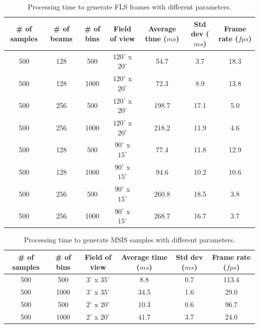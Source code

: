 \documentclass[final,5p,times]{elsarticle}
\begin{document}
\begin{table}[!h]
    \caption{Processing time to generate FLS frames with different parameters.}
    \label{table:fls}
    \begin{center}
        \begin{tabular}{| c | c | c | c | c | c | c |}
            \hline
            \# of samples & \# of beams & \# of bins & Field of view & Average time ($ms$) & Std dev ($ms$) & Frame rate ($fps$) \\
            \hline
            500     & 128     & 500       & $120^{\circ}$ x $20^{\circ}$        & 54.7    & 3.7   & 18.3 \\ \hline
            500     & 128     & 1000      & $120^{\circ}$ x $20^{\circ}$        & 72.3	& 8.9   & 13.8 \\ \hline
            500     & 256     & 500       & $120^{\circ}$ x $20^{\circ}$        & 198.7	& 17.1  & 5.0  \\ \hline
            500     & 256     & 1000      & $120^{\circ}$ x $20^{\circ}$        & 218.2	& 11.9  & 4.6  \\ \hline
            500     & 128     & 500       & $90^{\circ}$ x $15^{\circ}$         & 77.4	& 11.8  & 12.9 \\ \hline
            500     & 128     & 1000      & $90^{\circ}$ x $15^{\circ}$         & 94.6	& 10.2  & 10.6 \\ \hline
            500     & 256     & 500       & $90^{\circ}$ x $15^{\circ}$         & 260.8	& 18.5  & 3.8  \\ \hline
            500     & 256     & 1000      & $90^{\circ}$ x $15^{\circ}$         & 268.7	& 16.7  & 3.7  \\ \hline
        \end{tabular}
    \end{center}
\end{table}

\begin{table}
    \caption{Processing time to generate MSIS samples with different parameters.}
    \label{table:msis}
    \begin{center}
        \begin{tabular}{| c | c | c | c | c | c |}
            \hline
            \# of samples & \# of bins & Field of view & Average time ($ms$) & Std dev ($ms$) & Frame rate ($fps$) \\
            \hline
            500     & 500       & $3^{\circ}$ x $35^{\circ}$        & 8.8	    & 0.7  & 113.4 \\ \hline
            500     & 1000      & $3^{\circ}$ x $35^{\circ}$        & 34.5	& 1.6  & 29.0  \\ \hline
            500     & 500       & $2^{\circ}$ x $20^{\circ}$        & 10.3	& 0.6  & 96.7  \\ \hline
            500     & 1000      & $2^{\circ}$ x $20^{\circ}$        & 41.7	& 3.7  & 24.0  \\ \hline
        \end{tabular}
    \end{center}
\end{table}
\end{document}
